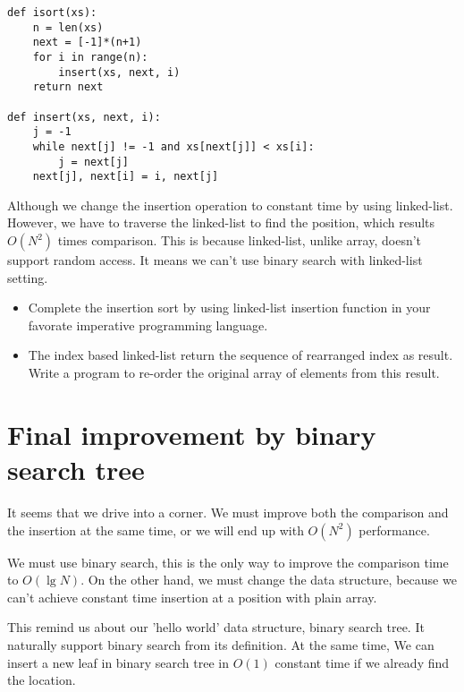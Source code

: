 \documentclass{article}
\begin{document}
\lstset{language=Python}
\begin{lstlisting}
def isort(xs):
    n = len(xs)
    next = [-1]*(n+1)
    for i in range(n):
        insert(xs, next, i)
    return next

def insert(xs, next, i):
    j = -1
    while next[j] != -1 and xs[next[j]] < xs[i]:
        j = next[j]
    next[j], next[i] = i, next[j]
\end{lstlisting}

Although we change the insertion operation to constant time by using 
linked-list. However, we have to traverse the linked-list to find the
position, which results $O(N^2)$ times comparison. This is because
linked-list, unlike array, doesn't support random access. It means we
can't use binary search with linked-list setting.

\begin{Exercise}
\begin{itemize}
\item Complete the insertion sort by using linked-list insertion function
in your favorate imperative programming language.
\item The index based linked-list return the sequence of rearranged index
as result. Write a program to re-order the original array of elements from
this result.
\end{itemize}
\end{Exercise}


\section{Final improvement by binary search tree}

It seems that we drive into a corner. We must improve both the comparison 
and the insertion at the same time, or we will end up with $O(N^2)$ performance.

We must use binary search, this is the only way to improve the comparison
time to $O(\lg N)$. On the other hand, we must change the data structure, 
because we can't achieve constant time insertion at a position with 
plain array.

This remind us about our 'hello world' data structure, binary search tree.
It naturally support binary search from its definition. At the same time,
We can insert a new leaf in binary search tree in $O(1)$ constant time
if we already find the location.
\end{document}
